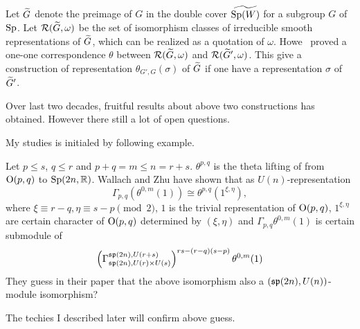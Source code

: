 \documentclass{amsart}
\begin{document}
Let $\tG$ denote the preimage of $G$ in the double cover
$\widetilde{\Sp(W)}$ for a subgroup $G$ of $\Sp$.  Let
$\sR(\tG,\omega)$ be the set of isomorphism classes of irreducible
smooth representations of $\tG$, which can be realized as a quotation
of $\omega$.  Howe~\cite{Howe1989Tran} proved a one-one correspondence
$\theta$ between $\sR(\tG,\omega)$ and $\sR(\tG',\omega)$.  This give
a construction of representation $\theta_{G',G}(\sigma)$ of $\tG$ if one have a representation $\sigma$
of $\tG'$. 

Over last two decades, fruitful results about above two constructions has obtained. However there still a lot of open questions.

\vspace{1em}

My studies is initialed by following example.

\begin{eg}\label{eg:wz2004}
Let $p\leq s$, $q\leq r$ and
$p+q=m\leq n=r+s$. 
$\theta^{p,q}$ is the theta lifting of  from $\O(p,q)$ to $\Sp(2n,\bR)$.
Wallach and Zhu \cite{WallachZhu2004} have shown that as $U(n)$-representation
\[
\Gamma_{p,q}(\theta^{0,m}(1)) \cong \theta^{p,q}(1^{\xi,\eta}),
\]
where $\xi \equiv r-q, \eta\equiv s-p \pmod{2}$, $1$ is the trivial representation of $\O(p,q)$, $1^{\xi,\eta}$ are certain character of $\O(p,q)$
determined by $(\xi, \eta)$ and
$\Gamma_{p,q}\theta^{0,m}(1)$ is certain submodule of 
\[
\left(\Gamma_{\sp(2n),U(r)\times U(s)}^{\sp(2n), U(r+s)}\right)^{rs-(r-q)(s-p)}\theta^{0,m}(1)
\]
They guess in their paper that the above isomorphism also a $(\sp(2n), U(n))$-module isomorphism?

The techies I described later will confirm above guess.
\end{eg}
\end{document}
